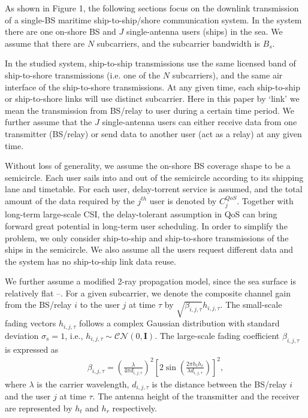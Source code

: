 \documentclass[conference]{IEEEtran}
\begin{document}

As shown in Figure 1, the following sections focus on the downlink transmission of a single-BS maritime ship-to-ship/shore communication system. In the system there are one on-shore BS
and  $J$ single-antenna users (ships) in the sea. We assume that there are $N$ subcarriers, and the subcarrier bandwidth is ${B_s}$. 

In the studied system, ship-to-ship transmissions use the same licensed band of ship-to-shore transmissions (i.e. one of the $N$ subcarriers), and the same air interface of the ship-to-shore transmissions. 
At any given time, each ship-to-ship or ship-to-shore links will use distinct subcarrier. Here in this paper by `link' we mean the transmission from BS/relay to user during a certain time period. We further assume that the $J$ single-antenna users can either receive data from one transmitter (BS/relay) or send data to another user (act as a relay) at any given time.

Without loss of generality, we assume the on-shore BS coverage shape to be a semicircle. 
Each user sails into and out of the semicircle according to its shipping lane and timetable. For each user, delay-torrent service is assumed, and the total amount of the data required by the ${j^{th}}$ user is denoted by $C_j^{QoS}$. Together with long-term large-scale CSI, the delay-tolerant assumption in QoS can bring forward great potential in long-term user scheduling. 
In order to simplify the problem, we only consider ship-to-ship and ship-to-shore transmissions of the ships in the semicircle. We also assume all the users request different data and the system has no ship-to-ship link data reuse.

We further assume a modified 2-ray propagation model, since the sea surface is relatively flat \cite{p0}--\cite{p2}. For a given subcarrier, we denote the composite channel gain from the BS/relay $i$ to the user $j$ at time $\tau $ by $\sqrt {{\beta _{i,j,\tau }}} {h_{i,j,\tau }}$. The small-scale fading vectors ${h_{i,j,\tau }}$ follows a complex Gaussian distribution with standard deviation ${\sigma _s} = 1$, i.e., ${h_{i,j,\tau }} \sim \mathcal{CN}(0, \mathbf{I})$. The large-scale fading coefficient ${\beta _{i,j,\tau }}$ is expressed as
\begin{align}
{\beta _{i,j,\tau }} = {\left( {\frac{\lambda }{{4\pi {d_{i,j,\tau }}}}} \right)^2}{\left[ {2\sin \left( {\frac{{2\pi {h_t}{h_r}}}{{\lambda {d_{i,j,\tau }}}}} \right)} \right]^2} ,
\end{align}
where $\lambda $ is the carrier wavelength, ${d_{i,j,\tau }}$ is the distance between the BS/relay $i$ and the user $j$ at time $\tau $. The antenna height of the transmitter and the receiver are represented by $h_t$ and $h_r$ respectively.
\end{document}
